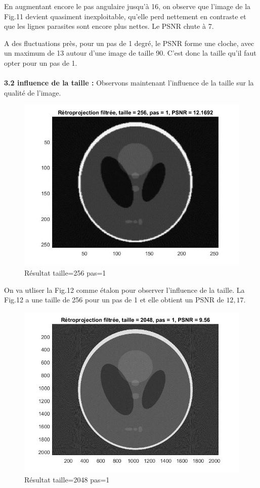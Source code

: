 \documentclass[conference]{IEEEtran}
\begin{document}
En augmentant encore le pas angulaire jusqu'à 16, on observe que l'image de la Fig.11 devient quasiment inexploitable, qu'elle perd nettement en contraste et que les lignes parasites sont encore plus nettes. Le PSNR chute à 7.

A des fluctuations près, pour un pas de 1 degré, le PSNR forme une cloche, avec un maximum de 13 autour d'une image de taille 90. C'est donc la taille qu'il faut opter pour un pas de 1.
\\
\\
\textbf{3.2 influence de la taille : }
Observons maintenant l'influence de la taille sur la qualité de l'image.


\begin{figure}[H]
\centering
\includegraphics[scale=0.38]{taille=256-pas=1}
	\caption[Résultat taille=256 pas=1]{Résultat taille=256 pas=1}
\label{fig:gallery}
\end{figure}

On va utliser la Fig.12 comme étalon pour observer l'influence de la taille. La Fig.12 a une taille de 256 pour un pas de 1 et elle obtient un PSNR de $12,17$.

\begin{figure}[H]
\centering
\includegraphics[scale=0.5]{t2048-p1}
	\caption[Résultat taille=2048 pas=1]{Résultat taille=2048 pas=1}
\label{fig:gallery}
\end{figure}
\end{document}
